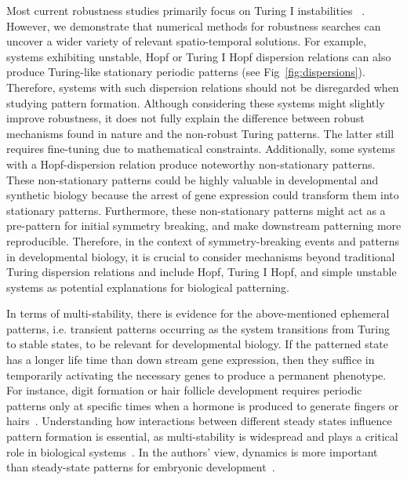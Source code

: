 \documentclass[10pt,letterpaper]{article}
\begin{document}
Most current robustness studies primarily focus on Turing I instabilities ~\cite{Scholes2019, Zheng2016, Marcon}.
However, we demonstrate that numerical methods for robustness searches can uncover a wider variety of relevant spatio-temporal solutions.
For example, systems exhibiting unstable, Hopf or Turing I Hopf dispersion relations can also produce Turing-like stationary periodic patterns (see Fig~\ref{fig:dispersions}). Therefore, systems with such dispersion relations should not be disregarded when studying pattern formation.
Although considering these systems might slightly improve robustness, it does not fully explain the difference between robust mechanisms found in nature and the non-robust Turing patterns. The latter still requires fine-tuning due to mathematical constraints.
Additionally, some systems with a Hopf-dispersion relation produce noteworthy non-stationary patterns.
These non-stationary patterns could be highly valuable in developmental and synthetic biology because the arrest of gene expression could transform them into stationary patterns.
Furthermore, these non-stationary patterns might act as a pre-pattern for initial symmetry breaking, and make downstream patterning more reproducible. 
Therefore, in the context of symmetry-breaking events and patterns in developmental biology, it is crucial to consider mechanisms beyond traditional Turing dispersion relations and include Hopf, Turing I Hopf, and simple unstable systems as potential explanations for biological patterning.


In terms of multi-stability, there is evidence for the above-mentioned ephemeral patterns, i.e. transient patterns occurring as the system transitions from Turing to stable states, to be relevant for developmental biology. If the patterned state has a longer life time than down stream gene expression, then they suffice in temporarily activating the necessary genes to produce a permanent phenotype.
For instance, digit formation or hair follicle development requires periodic patterns only at specific times when a hormone is produced to generate fingers or hairs~\cite{raspopovic2014digit,glover2023developmental}. 
Understanding how interactions between different steady states influence pattern formation is essential, as multi-stability is widespread and plays a critical role in biological systems~\cite{laurent1999multistability}. In the authors' view, dynamics is more important than steady-state patterns for embryonic development~\cite{pezzotta2023optimal}.
\end{document}
